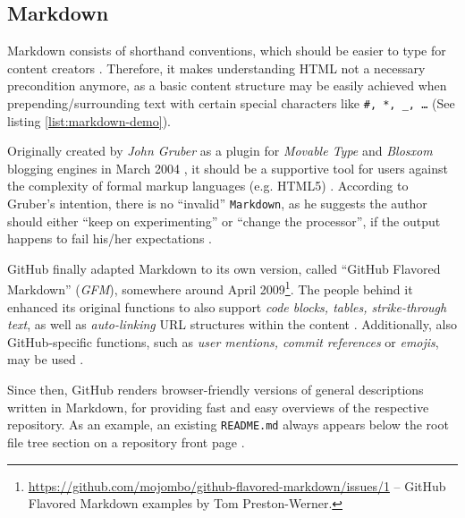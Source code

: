 \subsection{Markdown}
\label{sec:buildpipelines-markdown}



Markdown consists of shorthand conventions, which should be easier to type for content creators  \cite[38]{dhillon2016}.
Therefore, it makes understanding HTML not a necessary precondition anymore, as a basic content structure may be easily achieved when prepending/surrounding text with certain special characters like \texttt{\#, *, \_, \ldots} (See listing \ref{list:markdown-demo}).

Originally created by \emph{John Gruber} as a plugin for \emph{Movable Type} and \emph{Blosxom} blogging engines in March 2004 \cite{Markdown2004introduction}\cite{Markdown2004main}, it should be a supportive tool for users against the complexity of formal markup languages (e.g. HTML5) \cite[4]{RFC7764}. According to Gruber's intention, there is no ``invalid'' \texttt{Markdown}, as he suggests the author should either ``keep on experimenting'' or ``change the processor'', if the output happens to fail his/her expectations \cite[5]{RFC7764}.

GitHub finally adapted Markdown to its own version, called ``GitHub Flavored Markdown'' (\emph{GFM}), somewhere around April 2009\footnote{\url{https://github.com/mojombo/github-flavored-markdown/issues/1} -- GitHub Flavored Markdown examples by Tom Preston-Werner.}. The people behind it enhanced its original functions to also support \emph{code blocks, tables, strike-through text}, as well as \emph{auto-linking} URL structures within the content \cite[18]{RFC7764}. Additionally, also GitHub-specific functions, such as \emph{user mentions, commit references} or \emph{emojis}, may be used \cite{GithubFlavoredMarkdown}.

Since then, GitHub renders browser-friendly versions of general descriptions written in Markdown, for providing fast and easy overviews of the respective repository. As an example, an existing \texttt{README.md} always appears below the root file tree section on a repository front page \cite[5]{gandrud2013github}.
